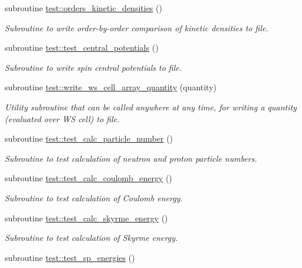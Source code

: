 \begin{DoxyCompactItemize}
subroutine \mbox{\hyperlink{namespacetest_a12069a39539c68f8d22f7eb4219d2e2b}{test\+::orders\+\_\+kinetic\+\_\+densities}} ()
\begin{DoxyCompactList}\small\item\em Subroutine to write order-\/by-\/order comparison of kinetic densities to file. \end{DoxyCompactList}\item 
subroutine \mbox{\hyperlink{namespacetest_a5693dbb30b96995df35fa720f0ab1436}{test\+::test\+\_\+central\+\_\+potentials}} ()
\begin{DoxyCompactList}\small\item\em Subroutine to write spin central potentials to file. \end{DoxyCompactList}\item 
subroutine \mbox{\hyperlink{namespacetest_ae6399ba2e0d2b484e6b467b2cee74a1b}{test\+::write\+\_\+ws\+\_\+cell\+\_\+array\+\_\+quantity}} (quantity)
\begin{DoxyCompactList}\small\item\em Utility subroutine that can be called anywhere at any time, for writing a quantity (evaluated over WS cell) to file. \end{DoxyCompactList}\item 
subroutine \mbox{\hyperlink{namespacetest_af860540d68e055817e3f618b7a04298a}{test\+::test\+\_\+calc\+\_\+particle\+\_\+number}} ()
\begin{DoxyCompactList}\small\item\em Subroutine to test calculation of neutron and proton particle numbers. \end{DoxyCompactList}\item 
subroutine \mbox{\hyperlink{namespacetest_ae4857dad0359d5f90718d5593398f8b3}{test\+::test\+\_\+calc\+\_\+coulomb\+\_\+energy}} ()
\begin{DoxyCompactList}\small\item\em Subroutine to test calculation of Coulomb energy. \end{DoxyCompactList}\item 
subroutine \mbox{\hyperlink{namespacetest_aa2a14f70fb7372abc970b6271f19417f}{test\+::test\+\_\+calc\+\_\+skyrme\+\_\+energy}} ()
\begin{DoxyCompactList}\small\item\em Subroutine to test calculation of Skyrme energy. \end{DoxyCompactList}\item 
subroutine \mbox{\hyperlink{namespacetest_abeb5e336395994821e96838b809e4140}{test\+::test\+\_\+sp\+\_\+energies}} ()

\end{DoxyCompactItemize}
